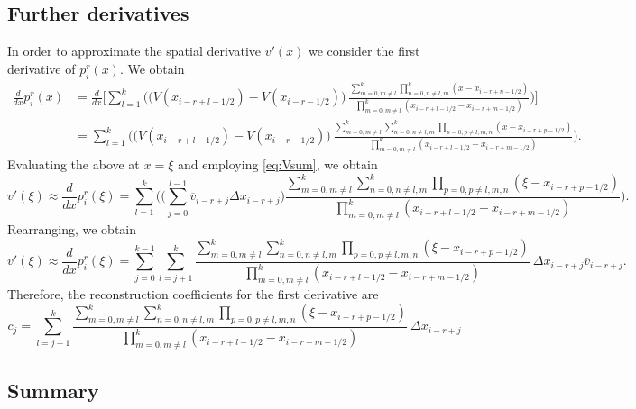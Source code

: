 \documentclass{article}
\newcommand{\dd}[2]{\frac{d #1}{d #2}}
\numberwithin{equation}{section}
\begin{document}

\subsection{Further derivatives}

In order to approximate the spatial derivative $v'(x)$ we consider the
first derivative of $p^r_i(x)$.  We obtain
\begin{align*}
  \dd{}{x} p^r_i(x) &= \dd{}{x} \Biggl[ \sum_{l=1}^{k} \Biggl(
  \bigl( V(x_{i-r+l-1/2}) - V(x_{i-r-1/2}) \bigr) \
    \frac{\sum_{m=0, m \neq l}^{k} \prod_{n=0, n \neq l,m}^{k}
      (x - x_{i-r+n-1/2})}{\prod_{m=0, m \neq l}^{k}
      (x_{i-r+l-1/2} - x_{i-r+m-1/2})} \Biggr) \Biggr] \\
    &= \sum_{l=1}^{k} \Biggl(
    \bigl( V(x_{i-r+l-1/2}) - V(x_{i-r-1/2}) \bigr) \
    \frac{\sum_{m=0, m \neq l}^{k} \sum_{n=0, n \neq l,m}^{k} \prod_{p=0, p \neq l, m, n}
      (x - x_{i-r+p-1/2})}{\prod_{m=0, m \neq l}^{k}
      (x_{i-r+l-1/2} - x_{i-r+m-1/2})} \Biggr).
\end{align*}
Evaluating the above at $x = \xi$ and employing \eqref{eq:Vsum}, we
obtain
\begin{equation*}
  v'(\xi) \approx \dd{}{x} p^r_i(\xi) = \sum_{l=1}^{k} \Biggl(
    \biggl( \sum_{j=0}^{l-1} \overline{v}_{i-r+j} \Delta x_{i-r+j} \biggr)
    \frac{\sum_{m=0, m \neq l}^{k} \sum_{n=0, n \neq l,m}^{k} \prod_{p=0, p \neq l, m, n}
      (\xi - x_{i-r+p-1/2})}{\prod_{m=0, m \neq l}^{k}
      (x_{i-r+l-1/2} - x_{i-r+m-1/2})} \Biggr).
\end{equation*}
Rearranging, we obtain
\begin{equation*}
  v'(\xi) \approx \dd{}{x} p^r_i(\xi) = \sum_{j=0}^{k-1} \sum_{l=j+1}^k
  \frac{\sum_{m=0, m \neq l}^{k} \sum_{n=0, n \neq l,m}^{k} \prod_{p=0, p \neq l, m, n}
    (\xi - x_{i-r+p-1/2})}{\prod_{m=0, m \neq l}^{k}
    (x_{i-r+l-1/2} - x_{i-r+m-1/2})}
  \ \Delta x_{i-r+j} \overline{v}_{i-r+j}.
\end{equation*}
Therefore, the reconstruction coefficients for the first derivative
are
\begin{equation*}
  c_j = \sum_{l=j+1}^k
  \frac{\sum_{m=0, m \neq l}^{k} \sum_{n=0, n \neq l,m}^{k} \prod_{p=0, p \neq l, m, n}
    (\xi - x_{i-r+p-1/2})}{\prod_{m=0, m \neq l}^{k}
    (x_{i-r+l-1/2} - x_{i-r+m-1/2})}
  \ \Delta x_{i-r+j}
\end{equation*}

\subsection{Summary}
\end{document}
